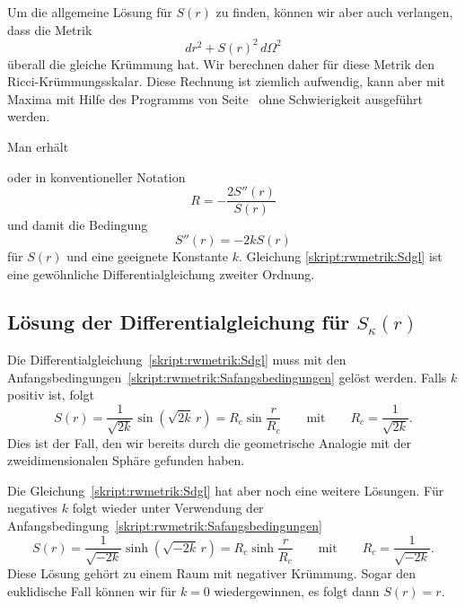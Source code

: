 Um die allgemeine Lösung für $S(r)$ zu finden, können wir
aber auch verlangen, dass die Metrik
\[
dr^2 + S(r)^2\,d\Omega^2
\]
überall die gleiche Krümmung hat.
Wir berechnen daher für diese Metrik den Ricci-Krümmungsskalar.
Diese Rechnung ist ziemlich aufwendig, kann aber mit Maxima
mit Hilfe des Programms von Seite~\pageref{skript:maxima:curvature}
ohne
Schwierigkeit ausgeführt werden.

Man erhält 

oder in konventioneller Notation
\[
R=
-\frac{2S''(r)}{S(r)}
\]
und damit die Bedingung
\begin{equation}
S''(r)=-2k S(r)
\label{skript:rwmetrik:Sdgl}
\end{equation}
für $S(r)$ und eine geeignete Konstante $k$.
Gleichung \eqref{skript:rwmetrik:Sdgl} ist eine gewöhnliche
Differentialgleichung zweiter Ordnung.

\subsection{Lösung der Differentialgleichung für $S_\kappa(r)$}
Die Differentialgleichung~\eqref{skript:rwmetrik:Sdgl}
muss mit den Anfangsbedingungen~\eqref{skript:rwmetrik:Safangsbedingungen}
gelöst werden.
Falls $k$ positiv ist, folgt
\begin{equation}
S(r)=\frac1{\sqrt{2k}}\sin(\sqrt{2k}\,r) = R_c\sin\frac{r}{R_c}
\qquad\text{mit}\qquad
R_c=\frac1{\sqrt{2k}}.
\label{skript:rwmetrik:sinloesung}
\end{equation}
Dies ist der Fall, den wir bereits durch die geometrische Analogie mit
der zweidimensionalen Sphäre gefunden haben.

Die Gleichung~\eqref{skript:rwmetrik:Sdgl} hat aber noch eine weitere 
Lösungen.
Für negatives $k$ folgt wieder unter Verwendung der
Anfangsbedingung~\eqref{skript:rwmetrik:Safangsbedingungen}
\begin{equation}
S(r)=\frac{1}{\sqrt{-2k}}\sinh(\sqrt{-2k}\, r)
=
R_c\sinh\frac{r}{R_c}
\qquad\text{mit}\qquad
R_c=\frac1{\sqrt{-2k}}.
\label{skript:rwmetrik:sinhloesung}
\end{equation}
Diese Lösung gehört zu einem Raum mit negativer Krümmung.
Sogar den euklidische Fall können wir für $k=0$ wiedergewinnen, es folgt
dann $S(r)=r$.

